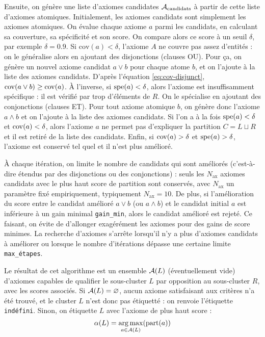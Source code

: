 Ensuite, on génère une liste d'axiomes candidates $\cal{A}_\text{candidats}$ à partir de cette liste d'axiomes atomiques. Initialement, les axiomes candidats sont simplement les axiomes atomiques. On évalue chaque axiome $a$ parmi les candidats, en calculant sa couverture, sa spécificité et son score. On compare alors ce score à un seuil $\delta$, par exemple $\delta = 0.9$. Si $\text{cov}(a) < \delta$, l'axiome $A$ ne couvre pas assez d'entités : on le généralise alors en ajoutant des disjonctions (clauses OU). %
Pour ça, on génère un nouvel axiome candidat $a \lor b$ pour chaque atome $b$, 
et on l'ajoute à la liste des axiomes candidats. D'après l'équation \ref{eq:cov-disjunct}, $\cov(a \lor b) \geq \cov(a)$.
À l'inverse, si $\spe(a) < \delta$, alors l'axiome est insuffisamment spécifique : il est vérifié par trop d'éléments de $R$. 
On le spécialise en ajoutant des conjonctions (clauses ET).
Pour tout axiome atomique $b$, on génère donc l'axiome $a \land b$ et on l'ajoute à la liste des axiomes candidats. 
Si l'on a à la fois $\spe(a) < \delta$ et $\cov(a) < \delta$, alors l'axiome $a$ ne permet pas d'expliquer la partition $C = L \sqcup R$ et il est retiré de la liste des candidats. Enfin, si $\cov(a) > \delta$ et $\spe(a) > \delta$, l'axiome est conservé tel quel et il n'est plus amélioré.

À chaque itération, on limite le nombre de candidats qui sont améliorés (c'est-à-dire étendus par des disjonctions ou des conjonctions) : seuls les $N_\text{ax}$ axiomes candidats avec le plus haut score de partition sont conservés, avec $N_\text{ax}$ un paramètre fixé empiriquement, typiquement $N_\text{ax} = 10$. 
De plus, si l'amélioration du score entre le candidat amélioré $a \lor b$ (ou $a \land b$) et le candidat initial $a$ est inférieure à un gain minimal \texttt{gain\_min}, alors le candidat amélioré est rejeté. Ce faisant, on évite de d'allonger exagérément les axiomes pour des gains de score minimes.
La recherche d'axiomes s'arrête lorsqu'il n'y a plus d'axiomes candidats à améliorer ou lorsque le nombre d'itérations dépasse une certaine limite \texttt{max\_étapes}. %

Le résultat de cet algorithme est un ensemble $\cal{A}(L)$ (éventuellement vide) d'axiomes capables de qualifier le sous-cluster $L$ par opposition au sous-cluster $R$, avec les scores associés. Si $\cal{A}(L) = \varnothing$, aucun axiome satisfaisant aux critères n'a été trouvé, et le cluster $L$ n'est donc pas étiquetté : on renvoie l'étiquette \texttt{indéfini}. Sinon, on étiquette $L$ avec l'axiome de plus haut score :
\begin{equation}
    \alpha(L) = \argmax_{a \in \cal{A}(L)}(\text{part}(a))
\end{equation}

